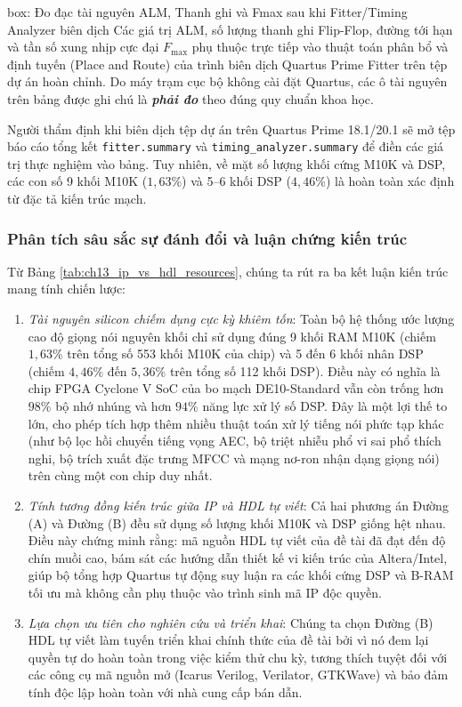 \begin{todo}{box: Đo đạc tài nguyên ALM, Thanh ghi và Fmax sau khi Fitter/Timing Analyzer biên dịch}
Các giá trị ALM, số lượng thanh ghi Flip-Flop, đường tới hạn và tần số xung nhịp cực đại $F_{\max}$ phụ thuộc trực tiếp vào thuật toán phân bổ và định tuyến (Place and Route) của trình biên dịch Quartus Prime Fitter trên tệp dự án hoàn chỉnh. Do máy trạm cục bộ không cài đặt Quartus, các ô tài nguyên trên bảng được ghi chú là \textbf{\emph{phải đo}} theo đúng quy chuẩn khoa học. 

Người thẩm định khi biên dịch tệp dự án trên Quartus Prime 18.1/20.1 sẽ mở tệp báo cáo tổng kết \texttt{fitter.summary} và \texttt{timing\_}\allowbreak\texttt{analyzer.summary} để điền các giá trị thực nghiệm vào bảng. Tuy nhiên, về mặt số lượng khối cứng M10K và DSP, các con số 9 khối M10K ($1{,}63\%$) và 5--6 khối DSP ($4{,}46\%$) là hoàn toàn xác định từ đặc tả kiến trúc mạch.
\end{todo}

\subsubsection*{Phân tích sâu sắc sự đánh đổi và luận chứng kiến trúc}
Từ Bảng \ref{tab:ch13_ip_vs_hdl_resources}, chúng ta rút ra ba kết luận kiến trúc mang tính chiến lược:
\begin{enumerate}
    \item \emph{Tài nguyên silicon chiếm dụng cực kỳ khiêm tốn}: Toàn bộ hệ thống ước lượng cao độ giọng nói nguyên khối chỉ sử dụng đúng 9 khối RAM M10K (chiếm $1{,}63\%$ trên tổng số 553 khối M10K của chip) và 5 đến 6 khối nhân DSP (chiếm $4{,}46\%$ đến $5{,}36\%$ trên tổng số 112 khối DSP). Điều này có nghĩa là chip FPGA Cyclone V SoC của bo mạch DE10-Standard vẫn còn trống hơn $98\%$ bộ nhớ nhúng và hơn $94\%$ năng lực xử lý số DSP. Đây là một lợi thế to lớn, cho phép tích hợp thêm nhiều thuật toán xử lý tiếng nói phức tạp khác (như bộ lọc hồi chuyển tiếng vọng AEC, bộ triệt nhiễu phổ vi sai phổ thích nghi, bộ trích xuất đặc trưng MFCC và mạng nơ-ron nhận dạng giọng nói) trên cùng một con chip duy nhất.
    \item \emph{Tính tương đồng kiến trúc giữa IP và HDL tự viết}: Cả hai phương án Đường (A) và Đường (B) đều sử dụng số lượng khối M10K và DSP giống hệt nhau. Điều này chứng minh rằng: mã nguồn HDL tự viết của đề tài đã đạt đến độ chín muồi cao, bám sát các hướng dẫn thiết kế vi kiến trúc của Altera/Intel, giúp bộ tổng hợp Quartus tự động suy luận ra các khối cứng DSP và B-RAM tối ưu mà không cần phụ thuộc vào trình sinh mã IP độc quyền.
    \item \emph{Lựa chọn ưu tiên cho nghiên cứu và triển khai}: Chúng ta chọn Đường (B) HDL tự viết làm tuyến triển khai chính thức của đề tài bởi vì nó đem lại quyền tự do hoàn toàn trong việc kiểm thử chu kỳ, tương thích tuyệt đối với các công cụ mã nguồn mở (Icarus Verilog, Verilator, GTKWave) và bảo đảm tính độc lập hoàn toàn với nhà cung cấp bán dẫn.
\end{enumerate}

